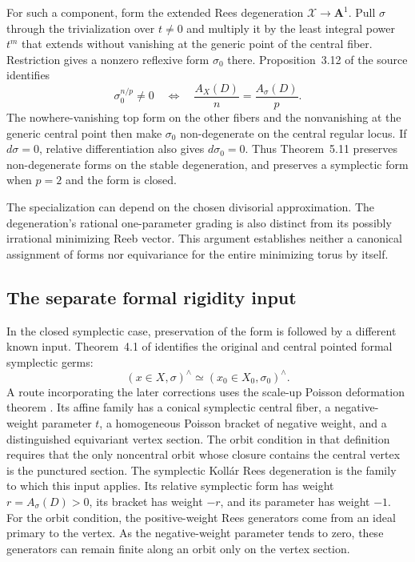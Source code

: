 For such a component, form the extended Rees degeneration
$\mathcal X\to\mathbf A^1$. Pull $\sigma$ through the
trivialization over $t\ne0$ and multiply it by the least integral
power $t^m$ that extends without vanishing at the generic point of
the central fiber. Restriction gives a nonzero reflexive form
$\sigma_0$ there. Proposition~3.12 of the source identifies
\[
\tag{68.23bq}\label{eq:ytd-local-form-specialization-criterion}
 \sigma_0^{n/p}\ne0
 \quad\Longleftrightarrow\quad
 \frac{A_X(D)}n=\frac{A_\sigma(D)}p.
\]
The nowhere-vanishing top form on the other fibers and the
nonvanishing at the generic central point then make $\sigma_0$
non-degenerate on the central regular locus. If $d\sigma=0$,
relative differentiation also gives $d\sigma_0=0$.
Thus Theorem~5.11 preserves non-degenerate forms on the stable
degeneration, and preserves a symplectic form when $p=2$ and
the form is closed.

The specialization can depend on the chosen divisorial approximation.
The degeneration's rational one-parameter grading is also distinct
from its possibly irrational minimizing Reeb vector. This argument
establishes neither a canonical assignment of forms nor equivariance
for the entire minimizing torus by itself.

\subsection{The separate formal rigidity input}
\label{sec:ytd-local-klt-symplectic-rigidity}

In the closed symplectic case, preservation of the form is followed
by a different known input. Theorem~4.1 of
\cite{XuZhuang26StableFormsV2} identifies the original and central
pointed formal symplectic germs:
\[
\tag{68.23br}\label{eq:ytd-local-symplectic-formal-isomorphism}
 (x\in X,\sigma)^\wedge
       \simeq(x_0\in X_0,\sigma_0)^\wedge.
\]
A route incorporating the later corrections uses the scale-up Poisson
deformation theorem \cite[Definition~3.1 and Theorems~3.3
and~3.5]{NamikawaOdaka26TorusV4}. Its affine family has a conical
symplectic central fiber, a negative-weight parameter $t$, a
homogeneous Poisson bracket of negative weight, and a distinguished
equivariant vertex section. The orbit condition in that definition
requires that the only noncentral orbit whose closure contains the
central vertex is the punctured section. The symplectic Koll\'ar
Rees degeneration is the family to which this input applies.
Its relative symplectic form has weight $r=A_\sigma(D)>0$,
its bracket has weight $-r$, and its parameter has weight $-1$.
For the orbit condition, the positive-weight Rees generators come
from an ideal primary to the vertex. As the negative-weight parameter
tends to zero, these generators can remain finite along an orbit
only on the vertex section.

